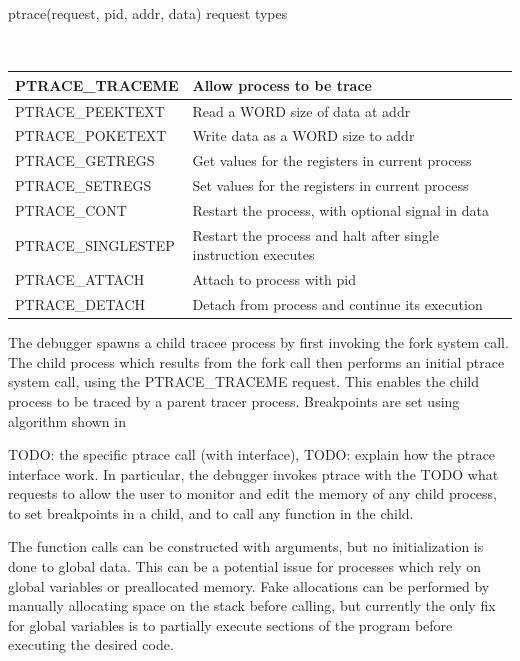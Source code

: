 \documentclass{article}
\begin{document}
\begin{center}
    \caption{ptrace(request, pid, addr, data) request types} \\
    \begin{tabular}{|l|l|}
    \hline
    PTRACE\_TRACEME    & Allow process to be trace \\ \hline
    PTRACE\_PEEKTEXT   & Read a WORD size of data at addr \\ \hline
    PTRACE\_POKETEXT   & Write data as a WORD size to addr \\ \hline
    PTRACE\_GETREGS    & Get values for the registers in current process \\ \hline
    PTRACE\_SETREGS    & Set values for the registers in current process \\ \hline
    PTRACE\_CONT       & Restart the process, with optional signal in data \\ \hline
    PTRACE\_SINGLESTEP & Restart the process and halt after single instruction executes \\ \hline
    PTRACE\_ATTACH     & Attach to process with pid \\ \hline
    PTRACE\_DETACH     & Detach from process and continue its execution \\ \hline
    \end{tabular}
\end{center}

The debugger spawns a child tracee process by first invoking the fork system call. The child process which results from
the fork call then performs an initial ptrace system call, using the PTRACE\_TRACEME request. This enables the child
process to be traced by a parent tracer process. Breakpoints are set using algorithm shown in %

TODO: the specific ptrace call (with interface), TODO: explain how the ptrace interface work. In particular, the
debugger invokes ptrace with the TODO {what requests} to allow the user to monitor and edit the memory of any child
process, to set breakpoints in a child, and to call any function in the child.

The function calls can be constructed with arguments, but no initialization is done to global data. This can be a
potential issue for processes which rely on global variables or preallocated memory. Fake allocations can be performed
by manually allocating space on the stack before calling, but currently the only fix for global variables is to
partially execute sections of the program before executing the desired code.
\end{document}
